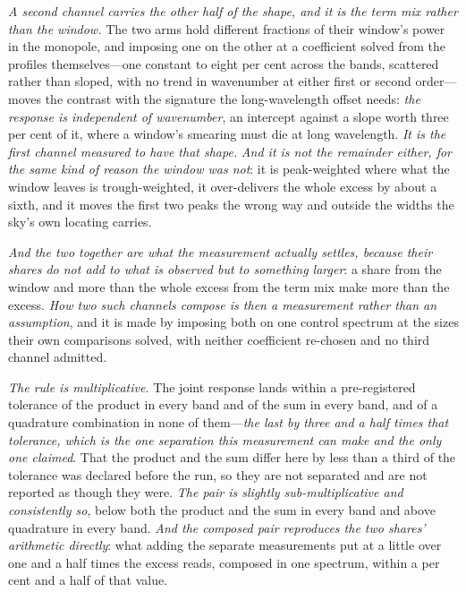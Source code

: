 \documentclass[11pt,a4paper]{article}
\theoremstyle{plain}
\theoremstyle{definition}
\theoremstyle{remark}
\begin{document}
\emph{A second channel carries the other half of the shape, and it is the term mix rather than the window.}
The two arms hold different fractions of their window's power in the monopole, and imposing one on the other
at a coefficient solved from the profiles themselves---one constant to eight per cent across the bands,
scattered rather than sloped, with no trend in wavenumber at either first or second order---moves
the contrast with the signature the long-wavelength offset needs: \emph{the response is independent of
wavenumber}, an intercept against a slope worth three per cent of it, where a window's smearing must die at
long wavelength. \emph{It is the first channel measured to have that shape.} \emph{And it is not the
remainder either, for the same kind of reason the window was not}: it is peak-weighted where what the window
leaves is trough-weighted, it over-delivers the whole excess by about a sixth, and it moves the first two peaks the wrong way and outside the widths the sky's own locating carries.

\emph{And the two together are what the measurement actually settles, because their shares do not add to
what is observed but to something larger}: a share from the window and more than the whole excess
from the term mix make more than the excess. \emph{How two such channels compose is then a
measurement rather than an assumption}, and it is made by imposing both on one control spectrum at the
sizes their own comparisons solved, with neither coefficient re-chosen and no third channel admitted.

\emph{The rule is multiplicative.} The joint response lands within a pre-registered tolerance of the
product in every band and of the sum in every band, and of a quadrature combination in none of
them---\emph{the last by three and a half times that tolerance, which is the one separation this
measurement can make and the only one claimed}. That the product and the sum differ here by less than a
third of the tolerance was declared before the run, so they are not separated and are not reported as
though they were. \emph{The pair is slightly sub-multiplicative and consistently so}, below both the
product and the sum in every band and above quadrature in every band. \emph{And the composed pair
reproduces the two shares' arithmetic directly}: what adding the separate measurements put at a little
over one and a half times the excess reads, composed in one spectrum, within a per cent and a half of that
value.
\end{document}
